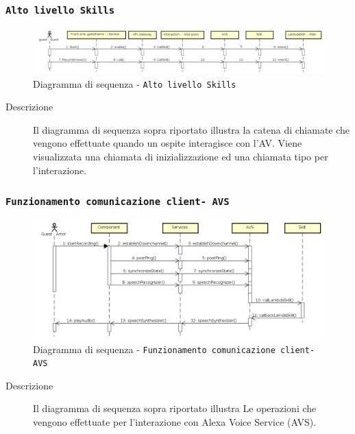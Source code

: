 \documentclass[../DefinizioneDiProdotto_v3.0.0.tex]{subfiles}
\begin{document}
\newpage
\subsubsection{\texttt{Alto livello Skills}}
\begin{figure}[!h]
	\centering
	\includegraphics[width=\textwidth]{DiagrammiSequenza/Back-End/SequenzaSkills.png}
	\caption{Diagramma di sequenza - \texttt{Alto livello Skills }}
\end{figure}
\begin{description}
	\item [Descrizione] Il diagramma di sequenza sopra riportato illustra la catena di chiamate che vengono effettuate quando un ospite interagisce con l'AV. Viene visualizzata una chiamata di inizializzazione ed una chiamata tipo per l'interazione.
\end{description}

\newpage
\subsubsection{\texttt{Funzionamento comunicazione client- AVS}}
\begin{figure}[!h]
	\centering
	\includegraphics[width=\textwidth]{DiagrammiSequenza/DiagrammaSequenzaGeneraleGuest.png}
	\caption{Diagramma di sequenza - \texttt{Funzionamento comunicazione client- AVS}}
\end{figure}
\begin{description}
	\item [Descrizione] Il diagramma di sequenza sopra riportato illustra Le operazioni che vengono effettuate per l'interazione con Alexa Voice Service (AVS).
\end{description}
\end{document}
